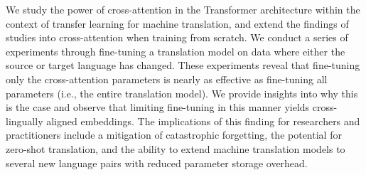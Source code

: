We study the power of cross-attention in the Transformer architecture within the context of transfer learning for machine translation, and extend the findings of studies into cross-attention when training from scratch. We conduct a series of experiments through fine-tuning a translation model on data where either the source or target language has changed. These experiments reveal that fine-tuning only the cross-attention parameters is nearly as effective as fine-tuning all parameters (i.e., the entire translation model). We provide insights into why this is the case and observe that limiting fine-tuning in this manner yields cross-lingually aligned embeddings. The implications of this finding for researchers and practitioners include a mitigation of catastrophic forgetting, the potential for zero-shot translation, and the ability to extend machine translation models to several new language pairs with reduced parameter storage overhead.
